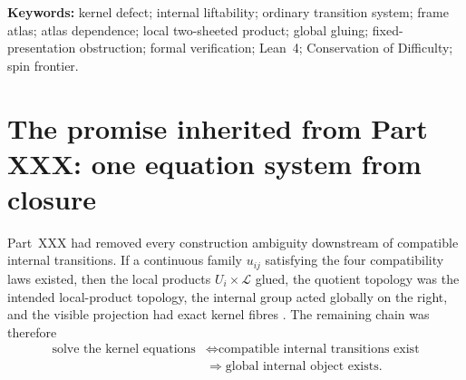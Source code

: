 \documentclass[11pt,a4paper]{article}
\theoremstyle{definition}
\newcommand{\Lift}{\mathcal{L}}
\begin{document}
\begin{abstract}
The Conservation-of-Difficulty principle therefore acts once again.  The obstruction has not disappeared, but neither has it reached bedrock.  Local representatives, repeated-index coherence, same-pair descent, simultaneous kernel equations, global gluing, surjectivity and exact two-sheeted fibres are no longer the frontier.  The remaining difficulty has moved one level deeper, into the quotient by ordinary presentation data itself:
\[
 \boxed{
 \text{internal kernel gauges}
 \;+
 \text{ordinary frame-chart changes}
 \;+
 \text{ordinary cover refinements}.}
\]
Part~XXXII should reconstruct that quotient intrinsically.  It must determine whether the neutral/non-neutral defect state descends from a fixed transition presentation to the underlying metric-oriented frame family, repair the present ``bad'' control under an atlas change, and then decide whether a genuinely atlas-independent non-neutral example survives.  Only after that step can the project legitimately claim either a global spatial lift obstruction or a spatial spin-structure closure.  The excavation therefore continues: Task~31 closes one equation system exactly and, in doing so, reveals that the ordinary atlas was still one floor above the desired invariant geometry.
\end{abstract}

\noindent\textbf{Keywords:} kernel defect; internal liftability; ordinary transition system; frame atlas; atlas dependence; local two-sheeted product; global gluing; fixed-presentation obstruction; formal verification; Lean~4; Conservation of Difficulty; spin frontier.

\tableofcontents
\newpage

\section{The promise inherited from Part XXX: one equation system from closure}\label{sec:promise}

Part~XXX had removed every construction ambiguity downstream of compatible internal transitions.  If a continuous family $u_{ij}$ satisfying the four compatibility laws existed, then the local products $U_i\times\Lift$ glued, the quotient topology was the intended local-product topology, the internal group acted globally on the right, and the visible projection had exact kernel fibres \cite{Experiment2PartXXX2026}.  The remaining chain was therefore
\begin{equation}\label{eq:part30chain}
\begin{aligned}
 \text{solve the kernel equations}
 &\Longleftrightarrow \text{compatible internal transitions exist}\\
 &\Longrightarrow \text{global internal object exists}.
\end{aligned}
\end{equation}
\end{document}
